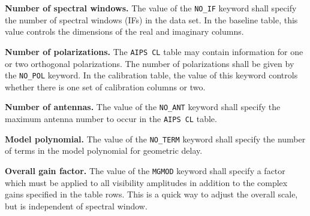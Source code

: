 \documentclass[twoside]{article}
\begin{document}
{\bf Number of spectral windows.} The value of the {\tt NO\_IF}
keyword shall specify the number of spectral windows (IFs) in the data
set.  In the baseline table, this value controls the dimensions of the
real and imaginary columns.

{\bf Number of polarizations.}  The {\tt AIPS CL} table may contain
information for one or two orthogonal polarizations.  The number of
polarizations shall be given by the {\tt NO\_POL} keyword.   In the
calibration table, the value of this keyword controls whether there is
one set of calibration columns or two.

{\bf Number of antennas.} The value of the {\tt NO\_ANT} keyword shall
specify the maximum antenna number to occur in the {\tt AIPS CL} table.

{\bf Model polynomial.} The value of the {\tt NO\_TERM} keyword shall
specify the number of terms in the model polynomial for geometric
delay.

{\bf Overall gain factor.} The value of the {\tt MGMOD} keyword shall
specify a factor which must be applied to all visibility amplitudes in
addition to the complex gains specified in the table rows.  This is a
quick way to adjust the overall scale, but is independent of spectral
window.
\vfill\eject
\end{document}
